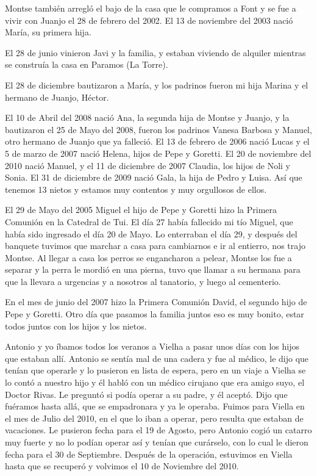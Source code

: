 \documentclass[12pt,a5paper]{book}
\begin{document}
Montse también arregló el bajo de la casa que le compramos a Font y se fue a vivir con Juanjo el 28 de febrero del 2002. El 13 de noviembre del 2003 nació María, su primera hija.

El 28 de junio vinieron Javi y la familia, y estaban viviendo de alquiler mientras se construía la casa en Paramos (La Torre).

El 28 de diciembre bautizaron a María, y los padrinos fueron mi hija Marina y el hermano de Juanjo, Héctor.

El 10 de Abril del 2008 nació Ana, la segunda hija de Montse y Juanjo, y la bautizaron el 25 de Mayo del 2008, fueron los padrinos Vanesa Barbosa y Manuel, otro hermano de Juanjo que ya falleció. El 13 de febrero de 2006 nació Lucas y el 5 de marzo de 2007 nació Helena, hijos de Pepe y Goretti. El 20 de noviembre del 2010 nació Manuel, y el 11 de diciembre de 2007 Claudia, los hijos de Noli y Sonia. El 31 de diciembre de 2009 nació Gala, la hija de Pedro y Luisa. Así que tenemos 13 nietos y estamos muy contentos y muy orgullosos de ellos.

El 29 de Mayo del 2005 Miguel el hijo de Pepe y Goretti hizo la Primera Comunión en la Catedral de Tui. El día 27 había fallecido mi tío Miguel, que había sido ingresado el día 20 de Mayo. Lo enterraban el día 29, y después del banquete tuvimos que marchar a casa para cambiarnos e ir al entierro, nos trajo Montse. Al llegar a casa los perros se engancharon a pelear, Montse los fue a separar y la perra le mordió en una pierna, tuvo que llamar a su hermana para que la llevara a urgencias y a nosotros al tanatorio, y luego al cementerio.

En el mes de junio del 2007 hizo la Primera Comunión David, el segundo hijo de Pepe y Goretti. Otro día que pasamos la familia juntos eso es muy bonito, estar todos juntos con los hijos y los nietos.

Antonio y yo íbamos todos los veranos a Vielha a pasar unos días con los hijos que estaban allí. Antonio se sentía mal de una cadera y fue al médico, le dijo que tenían que operarle y lo pusieron en lista de espera, pero en un viaje a Vielha se lo contó a nuestro hijo y él habló con un médico cirujano que era amigo suyo, el Doctor Rivas. Le preguntó si podía operar a su padre, y él aceptó. Dijo que fuéramos hasta allá, que se empadronara y ya le operaba. Fuimos para Viella en el mes de Julio del 2010, en el que lo iban a operar, pero resulta que estaban de vacaciones. Le pusieron fecha para el 19 de Agosto, pero Antonio cogió un catarro muy fuerte y no lo podían operar así y tenían que curárselo, con lo cual le dieron fecha para el 30 de Septiembre. Después de la operación, estuvimos en Viella hasta que se recuperó y volvimos el 10 de Noviembre del 2010.
\end{document}
